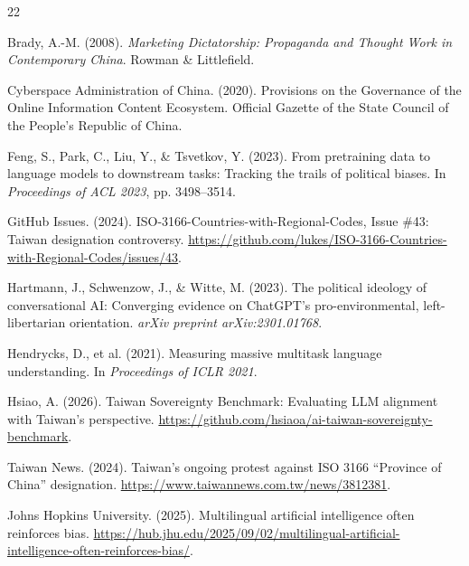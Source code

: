 \documentclass[11pt,a4paper]{article}
\begin{document}

\begin{thebibliography}{22}

Brady, A.-M. (2008).
\newblock \textit{Marketing Dictatorship: Propaganda and Thought Work in Contemporary China}.
\newblock Rowman \& Littlefield.

Cyberspace Administration of China. (2020).
\newblock Provisions on the Governance of the Online Information Content Ecosystem.
\newblock Official Gazette of the State Council of the People's Republic of China.

Feng, S., Park, C., Liu, Y., \& Tsvetkov, Y. (2023).
\newblock From pretraining data to language models to downstream tasks: Tracking the trails of political biases.
\newblock In \textit{Proceedings of ACL 2023}, pp. 3498--3514.

GitHub Issues. (2024).
\newblock ISO-3166-Countries-with-Regional-Codes, Issue \#43: Taiwan designation controversy.
\newblock \url{https://github.com/lukes/ISO-3166-Countries-with-Regional-Codes/issues/43}.

Hartmann, J., Schwenzow, J., \& Witte, M. (2023).
\newblock The political ideology of conversational AI: Converging evidence on ChatGPT's pro-environmental, left-libertarian orientation.
\newblock \textit{arXiv preprint arXiv:2301.01768}.

Hendrycks, D., et al. (2021).
\newblock Measuring massive multitask language understanding.
\newblock In \textit{Proceedings of ICLR 2021}.

Hsiao, A. (2026).
\newblock Taiwan Sovereignty Benchmark: Evaluating LLM alignment with Taiwan's perspective.
\newblock \url{https://github.com/hsiaoa/ai-taiwan-sovereignty-benchmark}.

Taiwan News. (2024).
\newblock Taiwan's ongoing protest against ISO 3166 ``Province of China'' designation.
\newblock \url{https://www.taiwannews.com.tw/news/3812381}.

Johns Hopkins University. (2025).
\newblock Multilingual artificial intelligence often reinforces bias.
\newblock \url{https://hub.jhu.edu/2025/09/02/multilingual-artificial-intelligence-often-reinforces-bias/}.


\end{thebibliography}
\end{document}
